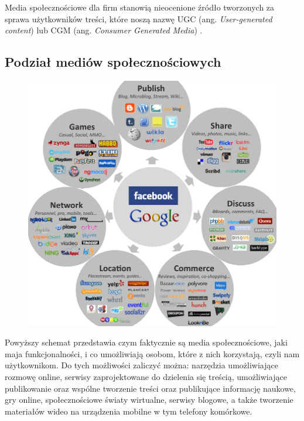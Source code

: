Media społecznościowe dla firm stanowią nieocenione źródło tworzonych za sprawa użytkowników treści, które noszą nazwę UGC (ang. \textit{User-generated content}) lub CGM (ang. \textit{Consumer Generated Media}) \cite{url:wiki-mashup}.


\subsection{Podział mediów społecznościowych}

\begin{figure}[!h]
\centering
    \scalebox{0.9}
    {
        \includegraphics{images/lukasz/social-media-landscape-20111_k.jpg}
    }
    \label{fig:sample-google-plus-company-profile-page}
\end{figure}

Powyższy schemat przedstawia czym faktycznie są media społecznościowe, jaki maja funkcjonalności, i co umożliwiają osobom, które z nich korzystają, czyli nam użytkownikom. Do tych możliwości zaliczyć można: narzędzia umożliwiające rozmowę online, serwisy zaprojektowane do dzielenia się treścią, umożliwiające publikowanie oraz wspólne tworzenie treści oraz publikujące informację naukowe, gry online, społecznościowe światy wirtualne, serwisy blogowe, a także tworzenie materiałów wideo na urządzenia mobilne w tym telefony komórkowe.

